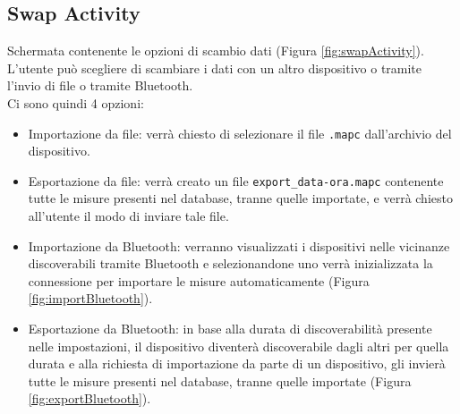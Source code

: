 \documentclass[11pt]{article}
\begin{document}
\subsection{Swap Activity}
\label{sec:swapActivity}
Schermata contenente le opzioni di scambio dati (Figura \ref{fig:swapActivity}). \\
L'utente può scegliere di scambiare i dati con un altro dispositivo o tramite l'invio di file o tramite Bluetooth. \\
Ci sono quindi 4 opzioni:
\begin{itemize}
    \item Importazione da file: verrà chiesto di selezionare il file \texttt{.mapc} dall'archivio del dispositivo.
    \item Esportazione da file: verrà creato un file \texttt{export\_data-ora.mapc} contenente tutte le misure presenti nel database, tranne quelle importate, e verrà chiesto all'utente il modo di inviare tale file.
    \item Importazione da Bluetooth: verranno visualizzati i dispositivi nelle vicinanze discoverabili tramite Bluetooth e selezionandone uno verrà inizializzata la connessione per importare le misure automaticamente (Figura \ref{fig:importBluetooth}).
    \item Esportazione da Bluetooth: in base alla durata di discoverabilità presente nelle impostazioni, il dispositivo diventerà discoverabile dagli altri per quella durata e alla richiesta di importazione da parte di un dispositivo, gli invierà tutte le misure presenti nel database, tranne quelle importate (Figura \ref{fig:exportBluetooth}).
\end{itemize}
\end{document}
